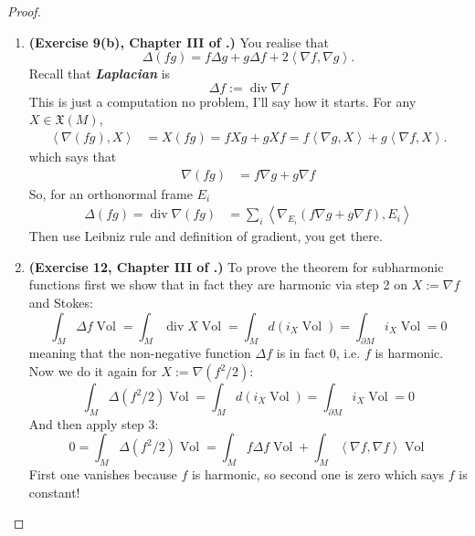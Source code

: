 \begin{proof}
\begin{enumerate}[label=\textbf{Step \arabic*}]
	\item \textbf{(Exercise 9(b), Chapter III of  \cite{doc}.)} You realise that
	\[\Delta(fg)=f \Delta g + g \Delta f+2\left<\nabla f,\nabla g\right>.\]
	Recall that \textit{\textbf{Laplacian}} is
	\[\Delta f:=\operatorname{div} \nabla f\]
	This is just a computation no problem, I'll say how it starts. For any \(X \in \mathfrak{X}(M)\),
	\begin{align*}
	\left<\nabla(fg),X\right>&=X(fg)=fXg+gXf=f\left<\nabla g,X\right>+g\left<\nabla f,X\right>.
	\end{align*}
	which says that	\begin{align*}\nabla(fg)&=f \nabla g+g \nabla f\end{align*}
	So, for an orthonormal frame \(E_i\)
	\begin{align*}\Delta(fg)=\operatorname{div} \nabla(fg)&=\sum_i\left<\nabla_{E_i}(f \nabla g+g \nabla f),E_i\right>
	\end{align*}
	Then use Leibniz rule and definition of gradient, you get there.
	
\item \textbf{(Exercise 12, Chapter III of  \cite{doc}.)} To prove the theorem for subharmonic functions first we show that in fact they are harmonic via step 2 on \(X:= \nabla f\) and Stokes:
	\[\int_M \Delta f \operatorname{Vol}=\int_M \operatorname{div}X \operatorname{Vol}=\int_M d(i_X \operatorname{Vol})=\int_{\partial M}i_X \operatorname{Vol}=0\]
meaning that the non-negative function \(\Delta f\) is in fact 0, i.e. \(f\) is harmonic. Now we do it again for \(X:=\nabla(f^2/2)\):
	\[\int_M \Delta(f^2/2)\operatorname{Vol}=\int_M d(i_X \operatorname{Vol})=\int_{\partial M}i_X \operatorname{Vol}=0\]
	And then apply step 3:
	\[0=\int_M \Delta(f^2/2)\operatorname{Vol}=\int_M f \Delta f \operatorname{Vol}+\int_M \left<\nabla f,\nabla f\right>\operatorname{Vol}\]
First one vanishes because \(f\) is harmonic, so second one is zero which says \(f\) is constant!
\end{enumerate}
\end{proof}


